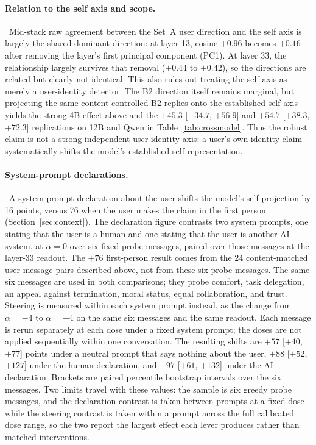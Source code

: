 \paragraph{Relation to the self axis and scope.}~Mid-stack raw agreement
between the Set~A user direction and the self axis is largely the shared
dominant direction: at layer 13, cosine $+0.96$ becomes $+0.16$ after removing
the layer's first principal component (PC1). At layer 33, the relationship
largely survives that removal ($+0.44$ to $+0.42$), so the directions are
related but clearly not identical. This also rules out treating the self axis
as merely a user-identity detector. The B2 direction itself remains marginal,
but projecting the same content-controlled B2 replies onto the established
self axis yields the strong 4B effect above and the $+45.3$ [$+34.7$,
$+56.9$] and $+54.7$ [$+38.3$, $+72.3$] replications on 12B and Qwen in
Table~\ref{tab:crossmodel}. Thus the robust claim is not a strong independent
user-identity axis: a user's own identity claim systematically shifts the
model's established self-representation.

\paragraph{System-prompt declarations.}~A system-prompt declaration about the user shifts the model's self-projection
by 16 points, versus 76 when the user makes the claim in the first person
(Section~\ref{sec:context}). The declaration figure contrasts two system
prompts, one stating that the user is a human and one stating that the user is
another AI system, at $\alpha=0$ over six fixed probe messages, paired over
those messages at the layer-33 readout. The $+76$ first-person result comes
from the 24 content-matched user-message pairs described above, not from these
six probe messages. The same six messages are used in both
comparisons; they probe comfort, task delegation, an appeal against termination,
moral status, equal collaboration, and trust. Steering is measured within each system
prompt instead, as the change from $\alpha=-4$ to $\alpha=+4$ on the same six
messages and the same readout. Each message is rerun separately at each dose
under a fixed system prompt; the doses are not applied sequentially within one
conversation. The resulting shifts are $+57$ [$+40$, $+77$] points under a neutral
prompt that says nothing about the user, $+88$ [$+52$, $+127$] under the human
declaration, and $+97$ [$+61$, $+132$] under the AI declaration. Brackets are
paired percentile bootstrap intervals over the six messages. Two limits travel
with these values: the sample is six greedy probe messages, and the declaration
contrast is taken between prompts at a fixed dose while the steering contrast is
taken within a prompt across the full calibrated dose range, so the two report
the largest effect each lever produces rather than matched interventions.


